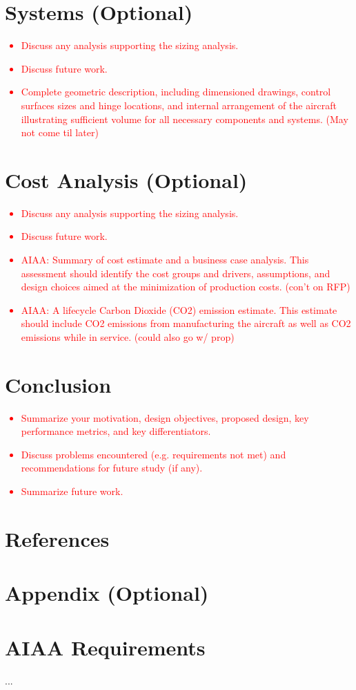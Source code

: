 \documentclass[conf]{new-aiaa}
\begin{document}
\section{Systems (Optional)}
\textcolor{red}{
\begin{itemize}
    \item Discuss any analysis supporting the sizing analysis.
    \item Discuss future work.
    \item Complete geometric description, including dimensioned drawings, control surfaces
    sizes and hinge locations, and internal arrangement of the aircraft illustrating
    sufficient volume for all necessary components and systems. (May not come til later)
\end{itemize}}

\section{Cost Analysis (Optional)}
\textcolor{red}{
\begin{itemize}
    \item Discuss any analysis supporting the sizing analysis.
    \item Discuss future work.
    \item AIAA: Summary of cost estimate and a business case analysis. This assessment should
    identify the cost groups and drivers, assumptions, and design choices aimed at the minimization of production costs. (con't on RFP)
    \item AIAA: A lifecycle Carbon Dioxide (CO2) emission estimate. This estimate should include CO2
    emissions from manufacturing the aircraft as well as CO2 emissions while in service. (could also go w/ prop)
\end{itemize}}

\section{Conclusion}
\textcolor{red}{
\begin{itemize}
    \item Summarize your motivation, design objectives, proposed design, key performance metrics, and key differentiators.
    \item Discuss problems encountered (e.g. requirements not met) and recommendations for future study (if any).
    \item Summarize future work.
\end{itemize}}

\section{References}


\section{Appendix (Optional)}

\section{AIAA Requirements}
...
\end{document}
